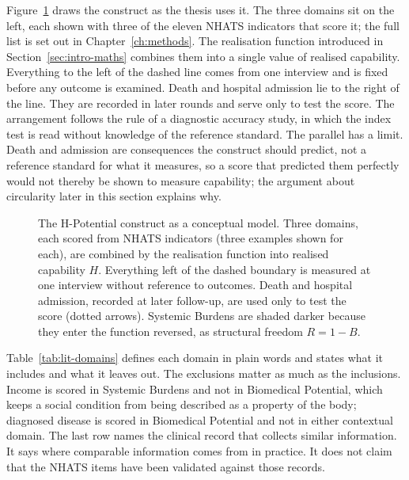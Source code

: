 Figure~\ref{fig:lit-model} draws the construct as the thesis uses it. The three domains sit on the left, each shown with three of the eleven NHATS indicators that score it; the full list is set out in Chapter~\ref{ch:methods}. The realisation function introduced in Section~\ref{sec:intro-maths} combines them into a single value of realised capability. Everything to the left of the dashed line comes from one interview and is fixed before any outcome is examined. Death and hospital admission lie to the right of the line. They are recorded in later rounds and serve only to test the score. The arrangement follows the rule of a diagnostic accuracy study, in which the index test is read without knowledge of the reference standard. The parallel has a limit. Death and admission are consequences the construct should predict, not a reference standard for what it measures, so a score that predicted them perfectly would not thereby be shown to measure capability; the argument about circularity later in this section explains why.

\begin{figure}[htbp]
\centering

\caption{The H-Potential construct as a conceptual model. Three domains, each scored from NHATS indicators (three examples shown for each), are combined by the realisation function into realised capability $H$. Everything left of the dashed boundary is measured at one interview without reference to outcomes. Death and hospital admission, recorded at later follow-up, are used only to test the score (dotted arrows). Systemic Burdens are shaded darker because they enter the function reversed, as structural freedom $R=1-B$.}
\label{fig:lit-model}
\end{figure}

Table~\ref{tab:lit-domains} defines each domain in plain words and states what it includes and what it leaves out. The exclusions matter as much as the inclusions. Income is scored in Systemic Burdens and not in Biomedical Potential, which keeps a social condition from being described as a property of the body; diagnosed disease is scored in Biomedical Potential and not in either contextual domain. The last row names the clinical record that collects similar information. It says where comparable information comes from in practice. It does not claim that the NHATS items have been validated against those records.

